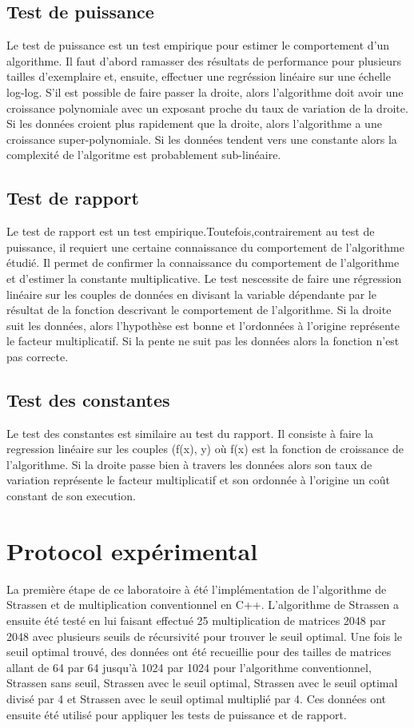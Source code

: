 \documentclass[a4paper, 12pt]{article} %
\begin{document}
\subsection{Test de puissance}
Le test de puissance est un test empirique pour estimer le comportement d'un algorithme. Il faut d'abord ramasser des résultats de performance pour plusieurs tailles d'exemplaire et, ensuite, effectuer
une regréssion linéaire sur une échelle log-log. S'il est possible de faire passer la droite, alors l'algorithme doit avoir une croissance polynomiale avec un exposant proche du taux de variation de la droite. Si les données croient plus rapidement que la droite, alors l'algorithme a une croissance super-polynomiale. Si les données tendent vers une constante alors la complexité de l'algoritme est probablement sub-linéaire.
\subsection{Test de rapport}
Le test de rapport est un test empirique.Toutefois,contrairement au test de puissance, il requiert une certaine connaissance du comportement de l'algorithme étudié. Il permet de confirmer la connaissance
du comportement de l'algorithme et d'estimer la constante multiplicative. Le test nescessite de faire une régression linéaire sur les couples de données en divisant la variable dépendante par le résultat
de la fonction descrivant le comportement de l'algorithme. Si la droite suit les données, alors l'hypothèse est bonne et l'ordonnées à l'origine représente le facteur multiplicatif. Si la pente ne suit pas les données alors la fonction n'est pas correcte.
\subsection{Test des constantes}
Le test des constantes est similaire au test du rapport. Il consiste à faire la regression linéaire sur les couples (f(x), y) où f(x) est la fonction de croissance de l'algorithme. Si la droite passe bien 
à travers les données alors son taux de variation représente le facteur multiplicatif et son ordonnée à l'origine un coût constant de son execution.
\section{Protocol expérimental}
La première étape de ce laboratoire à été l'implémentation de l'algorithme de Strassen et de multiplication conventionnel en C++. L'algorithme de Strassen a ensuite été testé en lui faisant effectué 25 multiplication de matrices 2048 par 2048 avec plusieurs seuils de récursivité pour trouver le seuil optimal. Une fois le seuil optimal trouvé, des données ont été recueillie pour des tailles de matrices allant de 64 par 64 jusqu'à 1024 par 1024 pour l'algorithme conventionnel, Strassen sans seuil, Strassen avec le seuil optimal, Strassen avec le seuil optimal divisé par 4 et Strassen avec le seuil optimal multiplié par 4. Ces données ont ensuite été utilisé pour appliquer les tests de puissance et de rapport.
\end{document}
